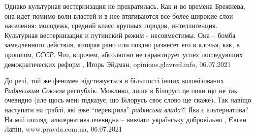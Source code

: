 Однако культурная вестернизация не прекратилась. Как и во времена Брежнева, она
идет помимо воли властей и в нее втягиваются все более широкие слои населения:
молодежь, средний класс крупных городов, интеллигенция.
Культурная вестернизация и путинский режим - несовместимы. Она – бомба
замедленного действия, которая рано или поздно разнесет его в клочья, как, в
прошлом, \emph{СССР}. Что, впрочем, абсолютно не гарантирует успех последующих
демократических реформ
, 
Игорь Эйдман, opinions.glavred.info, 06.07.2021

До речі, той же феномен відстежується в більшості інших колонізованих
\emph{Радянським Союзом} республік. Можливо, лише в Білорусі це поки що не так
очевидно (але щось мені підказує, що Білорусь своє слово ще скаже). Так навіщо
наступати на граблі, які вже \enquote{перевірила} \emph{радянська влада}?!  Яка
є альтернатива? На мій погляд, альтернатива очевидна – вивчати українську
добровільно
, 
Євген Лапін, www.pravda.com.ua, 06.07.2021

